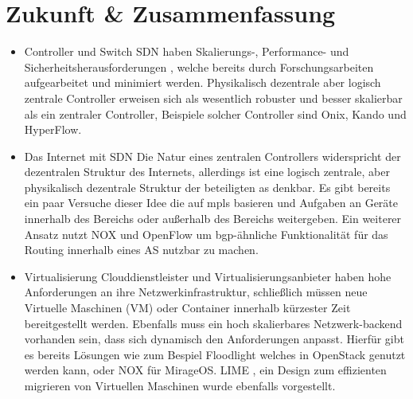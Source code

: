 \documentclass[twoside,12pt]{scrartcl}
\begin{document}
\section{Zukunft \& Zusammenfassung}
\begin{itemize}
	\item Controller und Switch
	SDN haben Skalierungs-, Performance- und Sicherheitsherausforderungen \cite{6739370}, welche bereits durch Forschungsarbeiten aufgearbeitet und minimiert werden. Physikalisch dezentrale aber logisch zentrale Controller erweisen sich als wesentlich robuster und besser skalierbar als ein zentraler Controller, Beispiele solcher Controller sind Onix, Kando und HyperFlow.
	\item Das Internet mit SDN
	Die Natur eines zentralen Controllers widerspricht der dezentralen Struktur des Internets, allerdings ist eine logisch zentrale, aber physikalisch dezentrale Struktur der beteiligten \gls{as} denkbar. Es gibt bereits ein paar Versuche dieser Idee die auf \gls{mpls} basieren und Aufgaben an Geräte innerhalb des Bereichs oder außerhalb des Bereichs weitergeben. Ein weiterer Ansatz nutzt NOX und OpenFlow  um \gls{bgp}-ähnliche Funktionalität für das Routing innerhalb eines AS nutzbar zu machen.
	\item Virtualisierung
	Clouddienstleister und Virtualisierungsanbieter haben hohe Anforderungen an ihre Netzwerkinfrastruktur, schließlich müssen neue Virtuelle Maschinen (VM) oder Container innerhalb kürzester Zeit bereitgestellt werden. Ebenfalls muss ein hoch skalierbares Netzwerk-backend vorhanden sein, dass sich dynamisch den Anforderungen anpasst. Hierfür gibt es bereits Lösungen wie zum Bespiel Floodlight welches in OpenStack genutzt werden kann, oder NOX für MirageOS. LIME \cite{lime}, ein Design zum effizienten migrieren von Virtuellen Maschinen wurde ebenfalls vorgestellt.
\end{itemize}
\newpage
	
	\listoffigures
	
	\printglossary[style=altlist,title=Glossar]
	
				
	 
	
\end{document}
